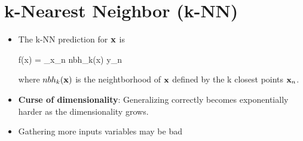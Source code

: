 
\section{k-Nearest Neighbor (k-NN)}
\begin{itemize}
	\item The k-NN prediction for $\mathbf{x}$ is
	\begin{myalign*}
	    f(\*x) =  \sum_{\*x_n \in nbh_k(\*x)} y_n
	\end{myalign*}
	where $nbh_k(\mathbf{x})$ is the neightborhood of $\mathbf{x}$ defined by the k closest points $\mathbf{x}_n$.
	\item \textbf{Curse of dimensionality}: Generalizing correctly becomes exponentially harder as the dimensionality grows.
	\item Gathering more inputs variables may be bad
\end{itemize}


